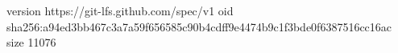 version https://git-lfs.github.com/spec/v1
oid sha256:a94ed3bb467c3a7a59f656585c90b4cdff9e4474b9c1f3bde0f6387516cc16ac
size 11076
